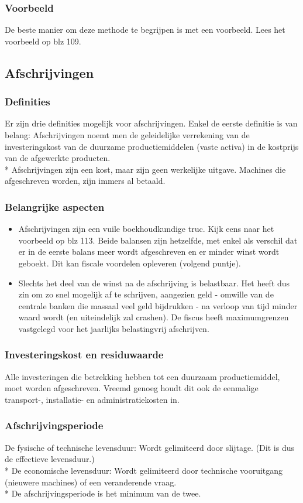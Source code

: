 \documentclass[12pt]{article}
\begin{document}
\subsubsection{Voorbeeld}
De beste manier om deze methode te begrijpen is met een voorbeeld. Lees het voorbeeld op blz 109.
\subsection{Afschrijvingen}
\subsubsection{Definities}
Er zijn drie definities mogelijk voor afschrijvingen. Enkel de eerste definitie is van belang: Afschrijvingen noemt men de geleidelijke verrekening van de investeringskost van de duurzame productiemiddelen (vaste activa) in de kostprijs van de afgewerkte producten.\\*
Afschrijvingen zijn een kost, maar zijn geen werkelijke uitgave. Machines die afgeschreven worden, zijn immers al betaald.
\subsubsection{Belangrijke aspecten}
\begin{itemize}
\item Afschrijvingen zijn een vuile boekhoudkundige truc. Kijk eens naar het voorbeeld op blz 113. Beide balansen zijn hetzelfde, met enkel als verschil dat er in de eerste balans meer wordt afgeschreven en er minder winst wordt geboekt. Dit kan fiscale voordelen opleveren (volgend puntje).
\item Slechts het deel van de winst na de afschrijving is belastbaar. Het heeft dus zin om zo snel mogelijk af te schrijven, aangezien geld - omwille van de centrale banken die massaal veel geld bijdrukken - na verloop van tijd minder waard wordt (en uiteindelijk zal crashen). De fiscus heeft maximumgrenzen vastgelegd voor het jaarlijks belastingvrij afschrijven.
\end{itemize}
\subsubsection{Investeringskost en residuwaarde}
Alle investeringen die betrekking hebben tot een duurzaam productiemiddel, moet worden afgeschreven. Vreemd genoeg houdt dit ook de eenmalige transport-, installatie- en administratiekosten in.
\subsubsection{Afschrijvingsperiode}
De fysische of technische levensduur: Wordt gelimiteerd door slijtage. (Dit is dus de effectieve levensduur.)\\*
De economische levensduur: Wordt gelimiteerd door technische vooruitgang (nieuwere machines) of een veranderende vraag.\\*
De afschrijvingsperiode is het minimum van de twee.
\end{document}
